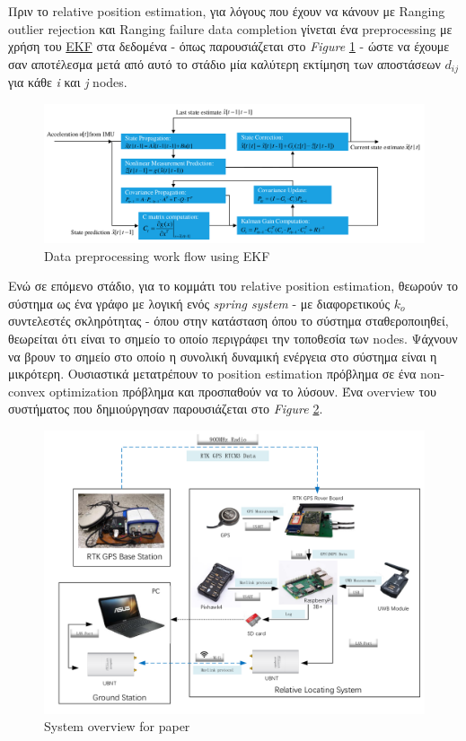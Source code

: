 Πριν το relative position estimation, για λόγους που έχουν να κάνουν με 
Ranging outlier rejection και Ranging failure data completion γίνεται ένα 
preprocessing με χρήση του \hyperref[abbr:EKF]{EKF} στα δεδομένα - όπως 
παρουσιάζεται στο \emph{Figure} \ref{fig:Data-preprocessing-work-flow-using-EKF} -
ώστε να έχουμε σαν αποτέλεσμα μετά από αυτό το στάδιο μία καλύτερη εκτίμηση των αποστάσεων $d_{ij}$ 
για κάθε \emph{i} και \emph{j} nodes. 

\begin{figure} [H]
	\centering
	\includegraphics[width=\linewidth]{Images/Related-Work/Data-preprocessing-work-flow-using-EKF.png}
	\decoRule
	\caption[Data preprocessing work flow using EKF]{Data preprocessing work flow using EKF\cite{uwb-imu-gps1}}
	\label{fig:Data-preprocessing-work-flow-using-EKF}
\end{figure}

Ενώ σε επόμενο στάδιο, για το κομμάτι του relative position estimation, θεωρούν το σύστημα ως ένα γράφο 
με λογική ενός \emph{spring system} - με διαφορετικούς $k_o$ συ\-ντε\-λεστές σκληρότητας - όπου στην κατάσταση 
όπου το σύστημα σταθεροποιηθεί, θεωρείται ότι είναι το σημείο
το οποίο περιγράφει την τοποθεσία των nodes. Ψάχνουν να βρουν το σημείο στο οποίο η συνολική δυναμική ενέργεια 
στο σύστημα είναι η μικρότερη. Ουσιαστικά μετατρέπουν το position estimation πρόβλημα σε ένα 
non-convex optimization πρόβλημα και προσπαθούν να το λύσουν. Ένα overview του συστήματος που δημιούργησαν 
παρουσιάζεται στο \emph{Figure} \ref{fig:paper1-overview}.

\begin{figure} [H]
	\centering
	\includegraphics[width=0.69
	\linewidth]{Images/Related-Work/UAV-swarm-system-diagram.png}
	\decoRule
	\caption[System overview]{System overview for paper \cite{uwb-imu-gps1}}
	\label{fig:paper1-overview}
\end{figure}







